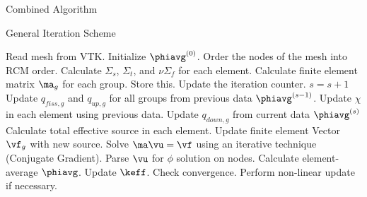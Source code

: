 \begin{frame}{Combined Algorithm}

    \begin{algorithm}[H]
      \caption{\scriptsize General Iteration Scheme}
      \label{algorithm:general}
      \begin{algorithmic}[1]
      \State Read mesh from VTK.
      \State Initialize $\phiavg^{(0)}$.
      \State Order the nodes of the mesh into RCM order.
        \label{state:rcm}
      \State Calculate $\Sigma_s$, $\Sigma_t$, and $\nu \Sigma_f$ for each 
        element.
      \State Calculate finite element matrix $\ma_g$ for each group. Store this. 
        \label{state:fem_matrix}
        \State Update the iteration counter. $s=s+1$
        \State Update $q_{fiss,g}$ and $q_{up,g}$ for all groups from previous 
          data $\phiavg^{(s-1)}$.
        \State Update $\chi$ in each element using previous data.
          \label{state:chi_collapse}
          \State Update $q_{down,g}$ from current data $\phiavg^{(s)}$
          \State Calculate total effective source in each element.
          \State Update finite element Vector $\vf_g$ with new source.
            \label{state:fem_vector}
          \State Solve $\ma \vu = \vf$ using an iterative technique (Conjugate
            Gradient).
          \State Parse $\vu$ for $\phi$ solution on nodes.
          \State Calculate element-average $\phiavg$.
        \EndFor
        \State Update $\keff$.
        \State Check convergence.
        \State Perform non-linear update if necessary. \label{state:nonlinear}
      \EndWhile
      \end{algorithmic}
    \end{algorithm}

\end{frame}
